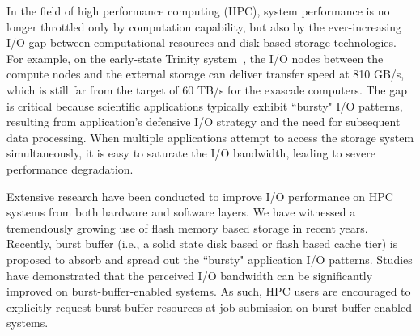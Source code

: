 In the field of high performance computing (HPC), 
system performance is no longer throttled only by computation capability,
but also by the ever-increasing I/O gap
between computational resources and disk-based storage technologies.
For example, on the early-state Trinity system~\cite{TrinitySystem}, the I/O nodes between
the compute nodes and the external storage can deliver transfer speed at 810 GB/s,
which is still far from the target of 60 TB/s for the exascale computers\cite{Shalf:HPCCS:2010}.
The gap is critical because scientific applications typically exhibit
``bursty" I/O patterns,
resulting from application's defensive I/O strategy
and the need  for subsequent data processing\cite{Carns:MSST:2011, Kim:PDSW:2010, Latham:CSD:2012, Naik:ICPPW:2009, Dennis:CUG:2009}. 
When multiple applications attempt to access the storage system simultaneously, 
it is easy to saturate
the I/O bandwidth, leading to severe performance degradation.


Extensive research have been conducted to improve I/O performance on HPC systems from
both hardware and software layers.
We have witnessed a tremendously growing use of flash memory based storage in recent years.
Recently, burst buffer (i.e., a solid state disk based or flash based cache tier)
is proposed to absorb and spread out
the ``bursty" application I/O patterns\cite{Bent:HBP:2011, Grider:EXA:2010}.
Studies have demonstrated that the perceived I/O
bandwidth can be significantly improved on burst-buffer-enabled systems\cite{Liu:MSST:2012}.
As such, HPC users are encouraged to explicitly request burst buffer resources at job submission 
on burst-buffer-enabled systems\cite{apex-workflow}.

